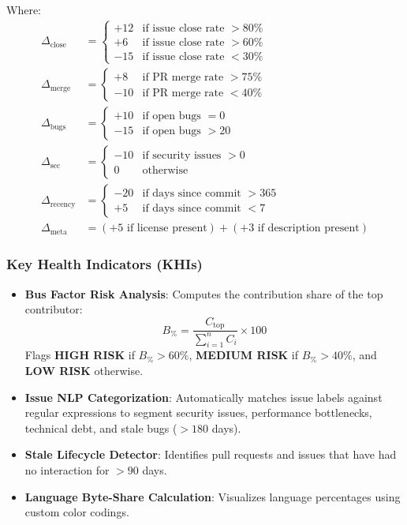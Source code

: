 \documentclass[11pt,a4paper]{article}
\begin{document}
Where:
\begin{align*}
\Delta_{\text{close}} &= \begin{cases} +12 & \text{if issue close rate } > 80\% \\ +6 & \text{if issue close rate } > 60\% \\ -15 & \text{if issue close rate } < 30\% \end{cases} \\
\Delta_{\text{merge}} &= \begin{cases} +8 & \text{if PR merge rate } > 75\% \\ -10 & \text{if PR merge rate } < 40\% \end{cases} \\
\Delta_{\text{bugs}}  &= \begin{cases} +10 & \text{if open bugs } = 0 \\ -15 & \text{if open bugs } > 20 \end{cases} \\
\Delta_{\text{sec}}   &= \begin{cases} -10 & \text{if security issues } > 0 \\ 0 & \text{otherwise} \end{cases} \\
\Delta_{\text{recency}} &= \begin{cases} -20 & \text{if days since commit } > 365 \\ +5 & \text{if days since commit } < 7 \end{cases} \\
\Delta_{\text{meta}}  &= (+5 \text{ if license present}) + (+3 \text{ if description present})
\end{align*}

\subsubsection{Key Health Indicators (KHIs)}
\begin{itemize}[leftmargin=1.5em]
    \item \textbf{Bus Factor Risk Analysis}: Computes the contribution share of the top contributor:
    \begin{equation}
    B_{\%} = \frac{C_{\text{top}}}{\sum_{i=1}^{n} C_i} \times 100
    \end{equation}
    Flags \textbf{HIGH RISK} if $B_{\%} > 60\%$, \textbf{MEDIUM RISK} if $B_{\%} > 40\%$, and \textbf{LOW RISK} otherwise.
    \item \textbf{Issue NLP Categorization}: Automatically matches issue labels against regular expressions to segment security issues, performance bottlenecks, technical debt, and stale bugs ($>180$ days).
    \item \textbf{Stale Lifecycle Detector}: Identifies pull requests and issues that have had no interaction for $>90$ days.
    \item \textbf{Language Byte-Share Calculation}: Visualizes language percentages using custom color codings.
\end{itemize}
\end{document}

